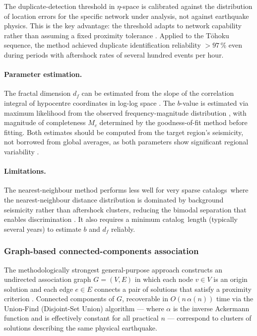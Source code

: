 \documentclass[12pt]{article}
\newcommand{\catalog}{catalog}
\newcommand{\catalogs}{catalogs}
\begin{document}
The duplicate-detection threshold in $\eta$-space is calibrated against the
distribution of location errors for the specific network under analysis, not
against earthquake physics.  This is the key advantage: the threshold adapts
to network capability rather than assuming a fixed proximity tolerance
\citep{Tanaka2022}.  Applied to the Tōhoku sequence, the method achieved
duplicate identification reliability $> 97$\,\% even during periods with
aftershock rates of several hundred events per hour.

\paragraph{Parameter estimation.}
The fractal dimension $d_f$ can be estimated from the slope of the correlation
integral of hypocentre coordinates in log-log space \citep{Kagan1991}.  The
$b$-value is estimated via maximum likelihood from the observed
frequency-magnitude distribution \citep{Aki1965}, with magnitude of
completeness $M_c$ determined by the \citet{Wiemer2000} goodness-of-fit method
before fitting.  Both estimates should be computed from the target region's
seismicity, not borrowed from global averages, as both parameters show
significant regional variability \citep{Woessner2005}.

\paragraph{Limitations.}
The nearest-neighbour method performs less well for very sparse \catalogs\ where
the nearest-neighbour distance distribution is dominated by background seismicity
rather than aftershock clusters, reducing the bimodal separation that enables
discrimination \citep{Hainzl2016}.  It also requires a minimum \catalog\ length
(typically several years) to estimate $b$ and $d_f$ reliably.

\subsubsection{Graph-based connected-components association}
\label{sec:graph}

The methodologically strongest general-purpose approach constructs an undirected
association graph $G = (V, E)$ in which each node $v \in V$ is an origin solution
and each edge $e \in E$ connects a pair of solutions that satisfy a proximity
criterion \citep{Patton2016, Zaliapin2013}.  Connected components of $G$,
recoverable in $O(n\,\alpha(n))$ time via the Union-Find (Disjoint-Set Union)
algorithm \citep{Tarjan1975} — where $\alpha$ is the inverse Ackermann
function and is effectively constant for all practical $n$ — correspond to
clusters of solutions describing the same physical earthquake.
\end{document}

